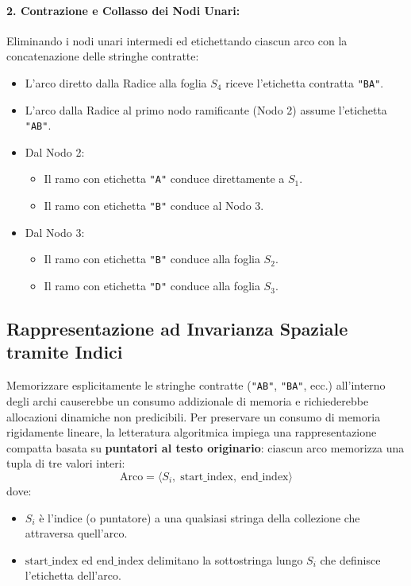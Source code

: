 \paragraph{2. Contrazione e Collasso dei Nodi Unari:}
Eliminando i nodi unari intermedi ed etichettando ciascun arco con la concatenazione delle stringhe contratte:
\begin{itemize}
  \item L'arco diretto dalla Radice alla foglia $S_4$ riceve l'etichetta contratta \texttt{"BA"}.
  \item L'arco dalla Radice al primo nodo ramificante (Nodo 2) assume l'etichetta \texttt{"AB"}.
  \item Dal Nodo 2:
  \begin{itemize}
    \item Il ramo con etichetta \texttt{"A"} conduce direttamente a $S_1$.
    \item Il ramo con etichetta \texttt{"B"} conduce al Nodo 3.
  \end{itemize}
  \item Dal Nodo 3:
  \begin{itemize}
    \item Il ramo con etichetta \texttt{"B"} conduce alla foglia $S_2$.
    \item Il ramo con etichetta \texttt{"D"} conduce alla foglia $S_3$.
  \end{itemize}
\end{itemize}

\FloatBarrier
\subsection{Rappresentazione ad Invarianza Spaziale tramite Indici}
\label{subsec:rappresentazione-indici-tuple}

Memorizzare esplicitamente le stringhe contratte (\texttt{"AB"}, \texttt{"BA"}, ecc.) all'interno degli archi causerebbe un consumo addizionale di memoria e richiederebbe allocazioni dinamiche non predicibili. 
Per preservare un consumo di memoria rigidamente lineare, la letteratura algoritmica impiega una rappresentazione compatta basata su \textbf{puntatori al testo originario}: ciascun arco memorizza una tupla di tre valori interi:
\begin{equation}
  \text{Arco} = \langle S_i, \; \text{start\_index}, \; \text{end\_index} \rangle
\end{equation}
dove:
\begin{itemize}
  \item $S_i$ \`e l'indice (o puntatore) a una qualsiasi stringa della collezione che attraversa quell'arco.
  \item $\text{start\_index}$ ed $\text{end\_index}$ delimitano la sottostringa lungo $S_i$ che definisce l'etichetta dell'arco.
\end{itemize}


